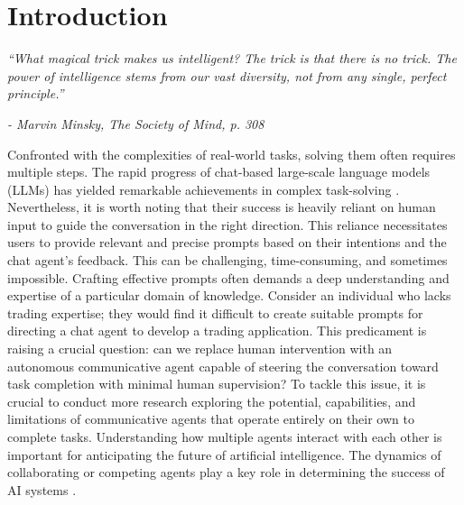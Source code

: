 \section{Introduction}
\textit{``What magical trick makes us intelligent? The trick is that there is no trick. The power of intelligence stems from our vast diversity, not from any single, perfect principle.''}

\qquad\qquad\qquad\qquad\qquad\qquad\qquad\qquad\qquad\qquad\qquad \textit{- Marvin Minsky, The Society of Mind, p. 308}

Confronted with the complexities of real-world tasks, solving them often requires multiple steps. The rapid progress of chat-based large-scale language models (LLMs) has yielded remarkable achievements in complex task-solving \cite{openai_chatgpt,ouyang2022training,thoppilan2022lamda,pichai_2023,claude,bai2022constitutional,wei2022emergent,bubeck2023sparks}. Nevertheless, it is worth noting that their success is heavily reliant on human input to guide the conversation in the right direction. This reliance necessitates users to provide relevant and precise prompts based on their intentions and the chat agent's feedback. This can be challenging, time-consuming, and sometimes impossible. Crafting effective prompts often demands a deep understanding and expertise of a particular domain of knowledge.
Consider an individual who lacks trading expertise; they would find it difficult to create suitable prompts for directing a 
chat agent to develop a trading application. This predicament is raising a crucial question: can we replace human intervention with an autonomous communicative agent capable of steering the conversation toward task completion with minimal
human supervision? To tackle this issue, it is crucial to conduct more research exploring the potential, capabilities, and limitations of communicative agents that operate entirely on their own to complete tasks. Understanding how multiple agents interact with each other is important for anticipating the future of artificial intelligence.
The dynamics of collaborating or competing agents play a key role in determining the success of AI systems \cite{asimov1940robot,dafoe2021cooperative,dafoe2020open,ouyang2022training,saunders2022self,bai2022training,bai2022constitutional}.

